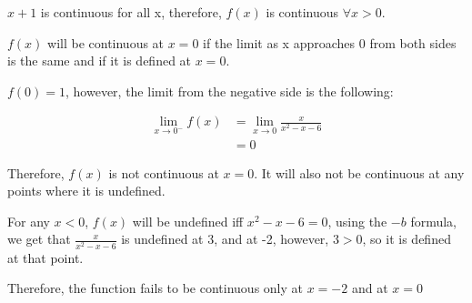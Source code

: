 \documentclass[12pt]{article} %
\begin{document}
\pagebreak

\begin{homeworkProblem}

    $x + 1$ is continuous for all x, therefore, $f(x)$ is continuous $\forall x > 0$.

    $f(x)$ will be continuous at $x = 0$ if the limit as x approaches 0 from both sides is the same and if it is defined at $x = 0$.

    $f(0) = 1$, however, the limit from the negative side is the following:

    \begin{align*}
        \lim_{x \to 0^-} f(x)
         & = \lim_{x \to 0} \frac{x}{x^2 - x - 6} \\
         & = 0
    \end{align*}

    Therefore, $f(x)$ is not continuous at $x = 0$. It will also not be continuous at any points where it is undefined.

    For any $x < 0$, $f(x)$ will be undefined iff $x^2 - x - 6 = 0$, using the $-b$ formula, we get that $ \frac{x}{x^2 - x - 6}$ is undefined at 3, and at -2,
    however, $3 > 0$, so it is defined at that point.

    Therefore, the function fails to be continuous only at $x = -2$ and at $x = 0$
\end{homeworkProblem}
\end{document}
